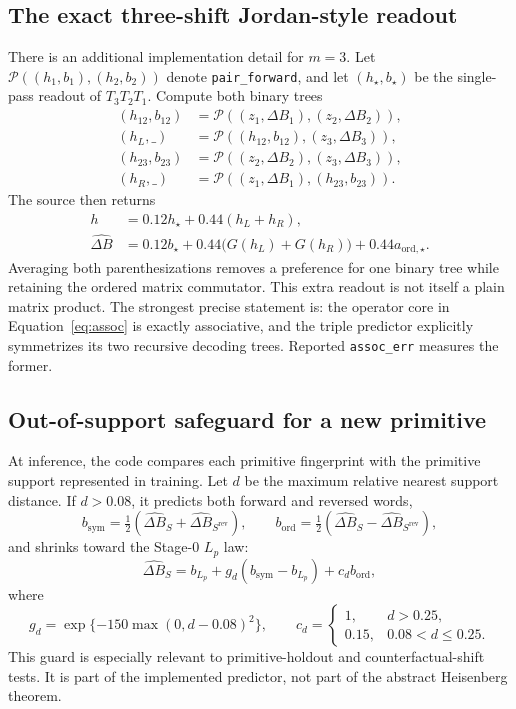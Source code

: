 \documentclass[11pt,a4paper]{article}
\newcommand{\dB}{\Delta B}
\newcommand{\dBh}{\widehat{\Delta B}}
\begin{document}
\subsection{The exact three-shift Jordan-style readout}

There is an additional implementation detail for $m=3$.  Let
$\mathcal{P}((h_1,b_1),(h_2,b_2))$ denote \texttt{pair\_forward}, and let
$(h_\star,b_\star)$ be the single-pass readout of $T_3T_2T_1$.  Compute both
binary trees
\begin{align}
(h_{12},b_{12})&=\mathcal{P}((z_1,\dB_1),(z_2,\dB_2)),\\
(h_L,\_)&=\mathcal{P}((h_{12},b_{12}),(z_3,\dB_3)),\\
(h_{23},b_{23})&=\mathcal{P}((z_2,\dB_2),(z_3,\dB_3)),\\
(h_R,\_)&=\mathcal{P}((z_1,\dB_1),(h_{23},b_{23})).
\end{align}
The source then returns
\begin{align}
h&=0.12h_\star+0.44(h_L+h_R),\\
\dBh&=0.12b_\star+0.44\big(G(h_L)+G(h_R)\big)+0.44a_{\mathrm{ord},\star}.
\label{eq:jordan}
\end{align}
Averaging both parenthesizations removes a preference for one binary tree while
retaining the ordered matrix commutator.  This extra readout is not itself a
plain matrix product.  The strongest precise statement is: the operator core
in Equation~\eqref{eq:assoc} is exactly associative, and the triple predictor
explicitly symmetrizes its two recursive decoding trees.  Reported
\texttt{assoc\_err} measures the former.

\subsection{Out-of-support safeguard for a new primitive}

At inference, the code compares each primitive fingerprint with the primitive
support represented in training.  Let $d$ be the maximum relative nearest
support distance.  If $d>0.08$, it predicts both forward and reversed words,
\[
b_{\mathrm{sym}}=\tfrac12(\dBh_S+\dBh_{S^{\mathrm{rev}}}),
\qquad
b_{\mathrm{ord}}=\tfrac12(\dBh_S-\dBh_{S^{\mathrm{rev}}}),
\]
and shrinks toward the Stage-0 $L_p$ law:
\begin{equation}
\dBh_S=b_{L_p}+g_d(b_{\mathrm{sym}}-b_{L_p})+c_d b_{\mathrm{ord}},
\end{equation}
where
\[
g_d=\exp\{-150\max(0,d-0.08)^2\},
\qquad
c_d=\begin{cases}1,&d>0.25,\\0.15,&0.08<d\le0.25.\end{cases}
\]
This guard is especially relevant to primitive-holdout and counterfactual-shift
tests.  It is part of the implemented predictor, not part of the abstract
Heisenberg theorem.
\end{document}
